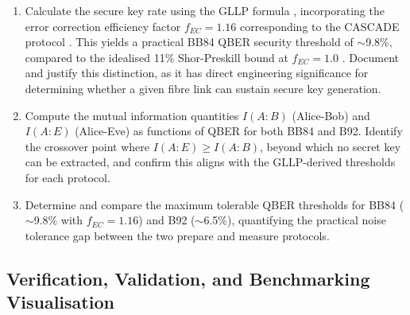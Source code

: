 \documentclass[10pt, a4paper]{report}
\begin{document}
\begin{enumerate}[label=\textbf{O4.\arabic*}, leftmargin=1.5cm]
    \item Calculate the secure key rate using the GLLP formula \cite{GLLP2004}, incorporating the error correction efficiency factor $f_{EC} = 1.16$ corresponding to the CASCADE protocol \cite{Cascade1994}. This yields a practical BB84 QBER security threshold of $\sim$9.8\%, compared to the idealised 11\% Shor-Preskill bound at $f_{EC} = 1.0$ \cite{ShorPreskill2000}. Document and justify this distinction, as it has direct engineering significance for determining whether a given fibre link can sustain secure key generation.

    \item Compute the mutual information quantities $I(A{:}B)$ (Alice-Bob) and $I(A{:}E)$ (Alice-Eve) as functions of QBER for both BB84 and B92. Identify the crossover point where $I(A{:}E) \geq I(A{:}B)$, beyond which no secret key can be extracted, and confirm this aligns with the GLLP-derived thresholds for each protocol.

    \item Determine and compare the maximum tolerable QBER thresholds for BB84 ($\sim$9.8\% with $f_{EC} = 1.16$) and B92 ($\sim$6.5\%), quantifying the practical noise tolerance gap between the two prepare and measure protocols.
\end{enumerate}

\subsection{Verification, Validation, and Benchmarking Visualisation}
\end{document}
